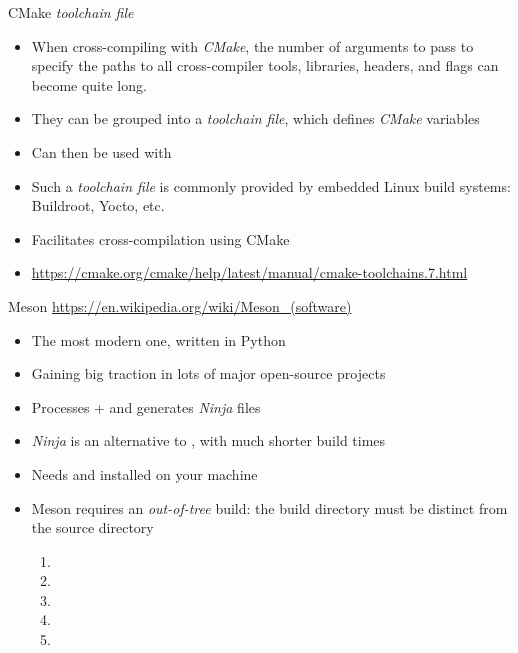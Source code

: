 \begin{frame}{CMake {\em toolchain file}}
  \begin{itemize}
  \item When cross-compiling with {\em CMake}, the number of arguments
    to pass to specify the paths to all cross-compiler tools,
    libraries, headers, and flags can become quite long.
  \item They can be grouped into a {\em toolchain file}, which defines
    {\em CMake} variables
  \item Can then be used with 
  \item Such a {\em toolchain file} is commonly provided by embedded
    Linux build systems: Buildroot, Yocto, etc.
  \item Facilitates cross-compilation using CMake
  \item \url{https://cmake.org/cmake/help/latest/manual/cmake-toolchains.7.html}
  \end{itemize}
\end{frame}

\begin{frame}{Meson}
  \url{https://en.wikipedia.org/wiki/Meson_(software)}
  \begin{itemize}
  \item The most modern one, written in Python
  \item Gaining big traction in lots of major open-source projects
  \item Processes  +  and
    generates {\em Ninja} files
  \item {\em Ninja} is an alternative to , with much
    shorter build times
  \item Needs  and  installed on your machine
  \item Meson requires an {\em out-of-tree} build: the build directory
    must be distinct from the source directory
    \begin{enumerate}
    \item {}
    \item {}
    \item {}
    \item {}
    \item {}
    \end{enumerate}
  \end{itemize}
\end{frame}


